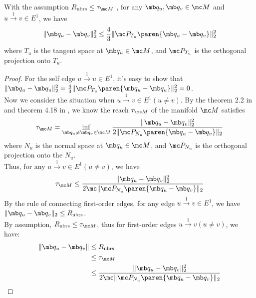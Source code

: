 
\begin{lemma}\label{lem:edge bounded by tangent term}
With the assumption $R_{\text{nbrs}} \leq \tau_{\mc M}$ , for any $\mb q_u, \mb q_v \in \mc M$ and $u\overset{1}{\rightarrow} v \in E^1$, we have
    \begin{equation}
        \| \mb q_u - \mb q_v \|_2^2
        \leq \frac{4}{3} \| \mc P_{T_u} \paren{\mb q_u - \mb q_v} \|_2^2
    \end{equation}
where $T_u$ is the tangent space at $\mb q_u \in \mc M$, and $\mc P_{T_u}$ is the orthogonal projection onto  $T_u$.
\end{lemma}
\begin{proof}
    For the self edge $u\overset{1}{\rightarrow} u \in E^1$, it's easy to show that $ \| \mb q_u - \mb q_u \|_2^2 = \frac{4}{3} \| \mc P_{T_u} \paren{\mb q_u - \mb q_u} \|_2^2 =0$.\\
    Now we consider the situation when $u\overset{1}{\rightarrow} v \in E^1 (u \neq v)$.  By the theorem 2.2 in \cite{aamari2019estimating} and theorem 4.18 in \cite{federer1959curvature}, we know the reach $\tau_{\mc M}$ of the manifold $\mc M$ satisfies
    \begin{equation}
    \tau_{\mc M} = \inf_{\mb q_u \neq \mb q_v \in \mc M}
    \frac{\| \mb q_u - \mb q_v \|_2^2}{2 \| \mc P_{N_u } \paren{\mb q_u - \mb q_v}\|_2}
\end{equation}
where $N_u$ is the normal space at $\mb q_u \in \mc M$, and $\mc P_{N_u}$ is the orthogonal projection onto the $N_u$.\\
Thus, for any $u\overset{1}{\rightarrow} v \in E^1 (u \neq v)$, we have
\begin{equation}
    \tau_{\mc M}
    \leq \frac{\| \mb q_u - \mb q_v \|_2^2}{2 \mc \| \mc P_{N_u} \paren{\mb q_u - \mb q_v} \|_2}
\end{equation}
By the rule of connecting first-order edges, for any edge $u\overset{1}{\rightarrow} v \in E^1$, we have $\| \mb q_u - \mb q_v \|_2 \leq R_{\text{nbrs}}$.\\
By assumption, $R_{\text{nbrs}} \leq \tau_{\mc M}$, thus for first-order edges $u\overset{1}{\rightarrow} v (u \neq v)$, we have:
\begin{equation}
    \begin{aligned}
    \| \mb q_u - \mb q_v \|
    &\leq R_{\text{nbrs}}\\
    &\leq \tau_{\mc M}\\
    &\leq \frac{\| \mb q_u - \mb q_v \|_2^2}{2 \mc \| \mc P_{N_u} \paren{\mb q_u - \mb q_v} \|_2}
    \end{aligned}

\end{equation}
\end{proof}

